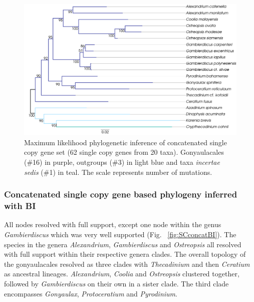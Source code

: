 \documentclass[12pt]{article}
\begin{document}
\begin{figure} 
\includegraphics[scale=.45]{figures/Singlecopy-concat-ML.png} 
\caption{Maximum likelihood phylogenetic inference of concatenated single copy gene set (62 single copy genes from 20 taxa). Gonyaulacales (\#16) in purple, outgroups (\#3) in light blue and taxa \textit{incertae sedis} (\#1) in teal. The scale represents number of mutations.} 
\label{fig:SCconcatML}
\end{figure} 
\FloatBarrier

\subsubsection*{Concatenated single copy gene based phylogeny inferred with BI}
\FloatBarrier 
All nodes resolved with full support, except one node within the genus \textit{Gambierdiscus} which was very well supported (Fig. ~\ref{fig:SCconcatBI}). 
The species in the genera \textit{Alexandrium}, \textit{Gambierdiscus} and \textit{Ostreopsis} all resolved with full support within their respective genera clades. 
The overall topology of the gonyaulacales resolved as three clades with \textit{Thecadinium} and then \textit{Ceratium} as ancestral lineages. 
\textit{Alexandrium}, \textit{Coolia} and \textit{Ostreopsis} clustered together, followed by \textit{Gambierdiscus} on their own in a sister clade. 
The third clade encompasses \textit{Gonyaulax}, \textit{Protoceratium} and \textit{Pyrodinium}. 
\end{document}
